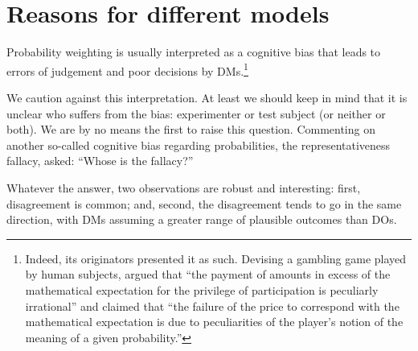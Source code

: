 \documentclass[12pt,letter,timesnewroman]{article}
\newcommand{\seclabel}[1]{\label{sec:#1}}
\newcommand{\ie}{\textit{i.e.}\ }
\begin{document}
\section{Reasons for different models\seclabel{Reasons_for}}
Probability weighting is usually interpreted as a cognitive bias that leads to errors of judgement and poor decisions by DMs.\footnote{Indeed, its originators presented it as such. Devising a gambling game played by human subjects, \textcite[p.~183--184]{PrestonBaratta1948} argued that ``the payment of amounts in excess of the mathematical expectation for the privilege of participation is peculiarly irrational'' and claimed that ``the failure of the price to correspond with the mathematical expectation is due to peculiarities of the player's notion of the meaning of a given probability.''}

We caution against this interpretation.
At least we should keep in mind that it is unclear who suffers from the bias: experimenter or test subject (or neither or both).
We are by no means the first to raise this question.
Commenting on another so-called cognitive bias regarding probabilities, the representativeness fallacy, \textcite{Cohen1979a} asked: ``Whose is the fallacy?''

Whatever the answer, two observations are robust and interesting: first, disagreement is common; and, second, the disagreement tends to go in the same direction, with DMs assuming a greater range of plausible outcomes than DOs.
\end{document}

